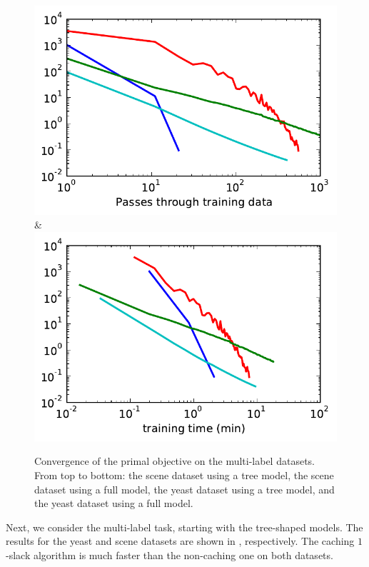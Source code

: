 \begin{figure}
\begin{tabu}
    \includegraphics[width=\linewidth]{evaluation/images/yeast_tree_log}&%
    \includegraphics[width=\linewidth]{evaluation/images/yeast_tree_log_time}
    \end{tabu}
\caption{%
   Convergence of the primal objective on the multi-label datasets. From top to
   bottom: the scene dataset using a tree model, the scene dataset using a full
   model, the yeast dataset using a tree model, and the yeast dataset using a
   full model.
}
\end{figure}

Next, we consider the multi-label task, starting with the tree-shaped models.
The results for the yeast and scene datasets are shown in ,
respectively. The caching $1$-slack algorithm is much faster than the non-caching one on both datasets.

